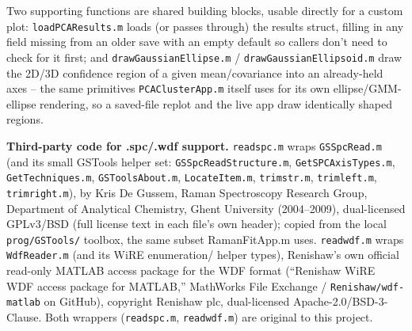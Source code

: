 \documentclass[11pt,a4paper]{article}
\newcommand{\code}[1]{\texttt{#1}}
\begin{document}
Two supporting functions are shared building blocks, usable directly for
a custom plot: \code{loadPCAResults.m} loads (or passes through) the
results struct, filling in any field missing from an older save with an
empty default so callers don't need to check for it first; and
\code{drawGaussianEllipse.m} / \code{drawGaussianEllipsoid.m} draw the
2D/3D confidence region of a given mean/covariance into an already-held
axes -- the same primitives \code{PCAClusterApp.m} itself uses for its
own ellipse/GMM-ellipse rendering, so a saved-file replot and the live
app draw identically shaped regions.

\begin{tbnote}
\textbf{Third-party code for .spc/.wdf support.} \code{readspc.m} wraps
\code{GSSpcRead.m} (and its small GSTools helper set: \code{GSSpcReadStructure.m},
\code{GetSPCAxisTypes.m}, \code{GetTechniques.m}, \code{GSToolsAbout.m},
\code{LocateItem.m}, \code{trimstr.m}, \code{trimleft.m}, \code{trimright.m}),
by Kris De Gussem, Raman Spectroscopy Research Group, Department of
Analytical Chemistry, Ghent University (2004--2009), dual-licensed
GPLv3/BSD (full license text in each file's own header); copied from the
local \code{prog/GSTools/} toolbox, the same subset RamanFitApp.m uses.
\code{readwdf.m} wraps \code{WdfReader.m} (and its WiRE enumeration/
helper types), Renishaw's own official read-only MATLAB access package
for the WDF format (``Renishaw WiRE WDF access package for MATLAB,''
MathWorks File Exchange / \code{Renishaw/wdf-matlab} on GitHub),
copyright Renishaw plc, dual-licensed Apache-2.0/BSD-3-Clause. Both
wrappers (\code{readspc.m}, \code{readwdf.m}) are original to this
project.
\end{tbnote}
\end{document}
